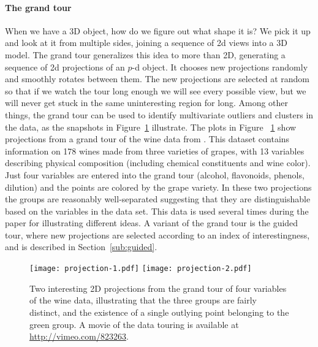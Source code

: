 \documentclass[preprint]{imsart}
\begin{document}
\paragraph{The grand tour} When we have a 3D object, how do we figure out what shape it is?  We pick it up and look at it from multiple sides, joining a sequence of 2d views into a 3D model.  The grand tour generalizes this idea to more than 2D, generating a sequence of 2d projections of an $p$-d object.  It chooses new projections randomly and smoothly rotates between them.  The new projections are selected at random so that if we watch the tour long enough we will see every possible view, but we will never get stuck in the same uninteresting region for long.  Among other things, the grand tour can be used to identify multivariate outliers and clusters in the data, as the snapshots in Figure~\ref{fig:projection} illustrate. The plots in Figure ~\ref{fig:projection} show projections from a grand tour of the wine data from \citet{asuncion:2007}. This dataset contains information on 178 wines made from three varieties of grapes, with 13 variables describing physical composition (including chemical constituents and wine color). Just four variables are entered into the grand tour (alcohol, flavonoids, phenols, dilution) and the points are colored by the grape variety. In these two projections the groups are reasonably well-separated suggesting that they are distinguishable based on the variables in the data set. This data is used several times during the paper for illustrating different ideas. A variant of the grand tour is the guided tour, where new projections are selected according to an index of interestingness, and is described in Section~\ref{sub:guided}.


\begin{figure}[htbp]
  \centering
    \texttt{[image: projection-1.pdf]}
    \texttt{[image: projection-2.pdf]}
    \caption{Two interesting 2D projections from the grand tour of
      four variables of the wine data, illustrating that the three
      groups are fairly distinct, and the existence of a single
      outlying point belonging to the green group.  A movie of the
      data touring is available at \url{http://vimeo.com/823263}.}
  \label{fig:projection}
\end{figure}
\end{document}
